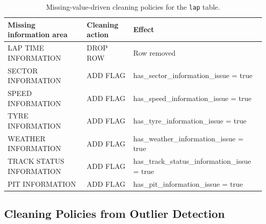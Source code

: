 \documentclass[11pt,a4paper]{article}
\begin{document}
	
	\begin{table}[H]
		\centering
		\small
		\caption{Missing-value-driven cleaning policies for the \texttt{lap} table.}
		\label{tab:lap-missing-cleaning}
		\begin{tabularx}{\linewidth}{
				>{\raggedright\arraybackslash}m{6cm}
				>{\raggedright\arraybackslash}m{4.2cm}
				>{\raggedright\arraybackslash}X
			}
			\toprule
			\textbf{Missing information area}
			& \textbf{Cleaning action}
			& \textbf{Effect} \\
			\midrule
			
			LAP TIME INFORMATION
			& DROP ROW
			& { \scriptsize Row removed} \\
			
			\midrule
			
			SECTOR INFORMATION
			& ADD FLAG
			& {\scriptsize has\_sector\_information\_issue = true} \\
			
			\midrule
			
			SPEED INFORMATION
			& ADD FLAG
			& {\scriptsize has\_speed\_information\_issue = true}  \\
			
			\midrule
			
			TYRE INFORMATION
			& ADD FLAG
			& {\scriptsize has\_tyre\_information\_issue = true} \\
			
			\midrule
			
			WEATHER INFORMATION
			& ADD FLAG
			& {\scriptsize has\_weather\_information\_issue = true} \\
			
			\midrule
			
			TRACK STATUS INFORMATION
			& ADD FLAG
			& {\scriptsize has\_track\_status\_information\_issue = true} \\
			
			\midrule
			
			PIT INFORMATION
			& ADD FLAG
			& {\scriptsize has\_pit\_information\_issue = true}  \\
			
			\bottomrule
		\end{tabularx}
	\end{table}
	
	\subsection{Cleaning Policies from Outlier Detection}
	
\end{document}

